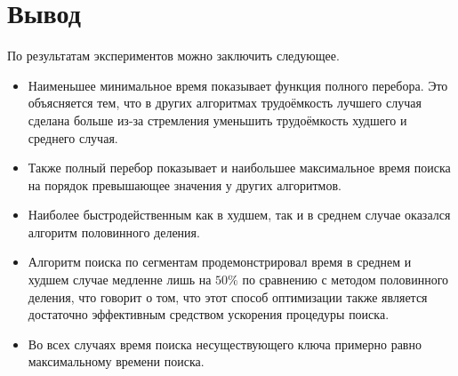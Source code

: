 \section*{Вывод}
По результатам экспериментов можно заключить следующее.
\begin{itemize}
	\item Наименьшее минимальное время показывает функция полного перебора. Это объясняется тем, что в других алгоритмах трудоёмкость лучшего случая сделана больше из-за стремления уменьшить трудоёмкость худшего и среднего случая.
	\item Также полный перебор показывает и наибольшее максимальное время поиска на порядок превышающее значения у других алгоритмов.
	\item Наиболее быстродейственным как в худшем, так и в среднем случае оказался алгоритм половинного деления.
	\item Алгоритм поиска по сегментам продемонстрировал время в среднем и худшем случае медленне лишь на $50\%$ по сравнению с методом половинного деления, что говорит о том, что этот способ оптимизации также является достаточно эффективным средством ускорения процедуры поиска.
	\item Во всех случаях время поиска несуществующего ключа примерно равно максимальному времени поиска.
\end{itemize}


	